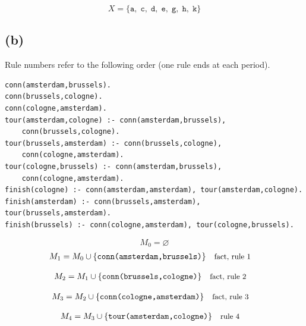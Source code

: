 \documentclass[a4paper,11pt]{article}
\newif\ifexplain
\newcommand{\explain}[1]{\ifexplain\begin{erklbox}#1\end{erklbox}\fi}
\newcommand{\why}[1]{\text{\small #1}}
\newcommand{\teil}[1]{\subsection*{(#1)}}
\newcommand{\at}[1]{\texttt{#1}}
\begin{document}
\[
\boxed{X=\{\at{a},\;\at{c},\;\at{d},\;\at{e},\;\at{g},\;\at{h},\;\at{k}\}}
\]
\explain{Die Probe besteht aus zwei Teilen: Jede aufgenommene Aussage hat oben eine passende Regel. Am Ende kann keine Regel ein weiteres Atom hinzufügen. Damit ist die Menge ein Modell und zugleich das kleinste Modell.}
\teil{b}
Rule numbers refer to the following order (one rule ends at each period).
\begin{small}
\begin{verbatim}
conn(amsterdam,brussels).
conn(brussels,cologne).
conn(cologne,amsterdam).
tour(amsterdam,cologne) :- conn(amsterdam,brussels),
    conn(brussels,cologne).
tour(brussels,amsterdam) :- conn(brussels,cologne),
    conn(cologne,amsterdam).
tour(cologne,brussels) :- conn(amsterdam,brussels),
    conn(cologne,amsterdam).
finish(cologne) :- conn(amsterdam,amsterdam), tour(amsterdam,cologne).
finish(amsterdam) :- conn(brussels,amsterdam), tour(brussels,amsterdam).
finish(brussels) :- conn(cologne,amsterdam), tour(cologne,brussels).
\end{verbatim}
\end{small}
\explain{Das Programm enthält keine Default-Negation. Wir beginnen bei der leeren Menge und wenden nur Regeln an, deren Körper bereits erfüllt ist. Fakten starten die Herleitung. Eine positive Schleife ohne diesen Start liefert dagegen keine Atome.}
\[
M_0=\varnothing
\]
\begin{align*}
M_{1} &= M_{0}\cup \{\at{conn(amsterdam,brussels)}\} && \why{fact, rule 1}
\end{align*}
\explain{Diese Regel hat keinen Körper. Ihr Kopf $\at{conn(amsterdam,brussels)}$ ist damit ein Fakt und muss in die Menge.}
\begin{align*}
M_{2} &= M_{1}\cup \{\at{conn(brussels,cologne)}\} && \why{fact, rule 2}
\end{align*}
\explain{Diese Regel hat keinen Körper. Ihr Kopf $\at{conn(brussels,cologne)}$ ist damit ein Fakt und muss in die Menge.}
\begin{align*}
M_{3} &= M_{2}\cup \{\at{conn(cologne,amsterdam)}\} && \why{fact, rule 3}
\end{align*}
\explain{Diese Regel hat keinen Körper. Ihr Kopf $\at{conn(cologne,amsterdam)}$ ist damit ein Fakt und muss in die Menge.}
\begin{align*}
M_{4} &= M_{3}\cup \{\at{tour(amsterdam,cologne)}\} && \why{rule 4}
\end{align*}
\explain{Für $\at{tour(amsterdam,cologne)}$ brauchen wir $\at{conn(amsterdam,brussels)}$ und $\at{conn(brussels,cologne)}$. Weil diese Voraussetzungen bereits hergeleitet sind, dürfen wir den Regelkopf jetzt aufnehmen und alle bisherigen Atome behalten; bei einer fehlenden Voraussetzung würde diese Regel dagegen noch nichts beitragen.}
\end{document}
